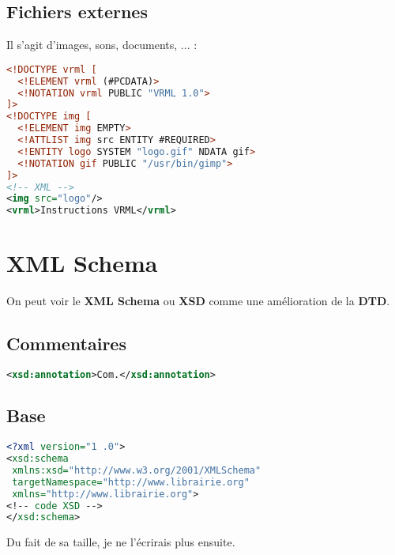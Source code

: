         \subsection{Fichiers externes}
            Il s'agit d'images, sons, documents, ... :
            \begin{lstlisting}[language=XML]
<!DOCTYPE vrml [
  <!ELEMENT vrml (#PCDATA)>
  <!NOTATION vrml PUBLIC "VRML 1.0">
]>
<!DOCTYPE img [
  <!ELEMENT img EMPTY>
  <!ATTLIST img src ENTITY #REQUIRED>
  <!ENTITY logo SYSTEM "logo.gif" NDATA gif>
  <!NOTATION gif PUBLIC "/usr/bin/gimp">
]>
<!-- XML -->
<img src="logo"/>
<vrml>Instructions VRML</vrml>
            \end{lstlisting}
    \section{XML Schema}
        On peut voir le \textbf{XML Schema} ou \textbf{XSD} comme une amélioration de la \textbf{DTD}.
        \subsection{Commentaires}
            \begin{lstlisting}[language=XML]
<xsd:annotation>Com.</xsd:annotation>
            \end{lstlisting}
        \subsection{Base}
            \begin{lstlisting}[language=XML]
<?xml version="1 .0">
<xsd:schema
 xmlns:xsd="http://www.w3.org/2001/XMLSchema"
 targetNamespace="http://www.librairie.org"
 xmlns="http://www.librairie.org">
<!-- code XSD -->
</xsd:schema>
            \end{lstlisting}
            Du fait de sa taille, je ne l'écrirais plus ensuite.

